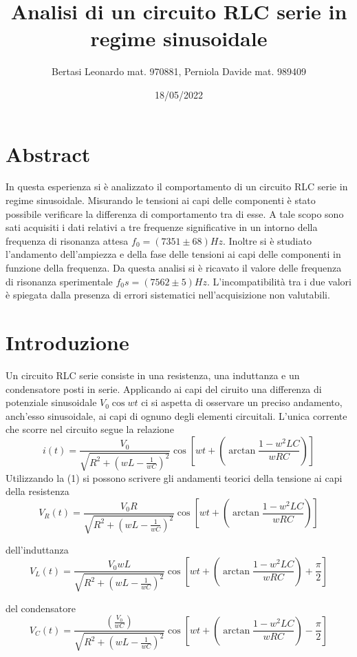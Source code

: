 \documentclass{article}
\title{Analisi di un circuito RLC serie in regime sinusoidale}
\date{18/05/2022}
\author{Bertasi Leonardo mat. 970881, Perniola Davide mat. 989409}
\begin{document}
\maketitle
\section{Abstract} 
In questa esperienza si è analizzato il comportamento di un circuito RLC serie in regime sinusoidale. Misurando le tensioni ai capi delle componenti è stato possibile
verificare la differenza di comportamento tra di esse. A tale scopo sono sati acquisiti i dati relativi a tre frequenze significative in un intorno della frequenza di risonanza attesa $f_0=(7351\pm68)Hz$.
Inoltre si è studiato l'andamento dell'ampiezza e della fase delle tensioni ai capi delle componenti in funzione della frequenza. Da questa analisi si è ricavato il valore delle frequenza di risonanza sperimentale $f_0s=(7562\pm5)Hz$.
L'incompatibilità tra i due valori è spiegata dalla presenza di errori sistematici nell'acquisizione non valutabili. 


\section{Introduzione} 
Un circuito RLC serie consiste in una resistenza, una induttanza e un condensatore posti in serie. Applicando ai capi del ciruito una differenza di potenziale sinusoidale $V_{0}\cos{wt} $ ci si aspetta di osservare un preciso andamento, anch'esso sinusoidale,
 ai capi di ognuno degli elementi circuitali. L'unica corrente che scorre nel circuito segue la relazione
\begin{equation}
  i(t)=\frac{V_{0}}{\sqrt{R^2+(wL-\frac{1}{wC})^2}}\cos{[wt+(\arctan{\frac{1-w^2LC}{wRC}})]}
\end{equation}
Utilizzando la (1) si possono scrivere gli andamenti teorici della tensione ai capi della resistenza
\begin{equation}
 V_{R}(t)= \frac{V_{0}R}{\sqrt{R^2+(wL-\frac{1}{wC})^2}}\cos{[wt+(\arctan{\frac{1-w^2LC}{wRC}})]}
\end{equation}

dell'induttanza
\begin{equation}
  V_{L}(t)=\frac{V_{0}wL}{\sqrt{R^2+(wL-\frac{1}{wC})^2}}\cos{[wt+(\arctan{\frac{1-w^2LC}{wRC}})+\frac{\pi}{2}]}
\end{equation}

del condensatore
\begin{equation}
  V_{C}(t)=\frac{(\frac{V_{0}}{wC})}{\sqrt{R^2+(wL-\frac{1}{wC})^2}}\cos{[wt+(\arctan{\frac{1-w^2LC}{wRC}})-\frac{\pi}{2}]}
\end{equation} 
\end{document}
